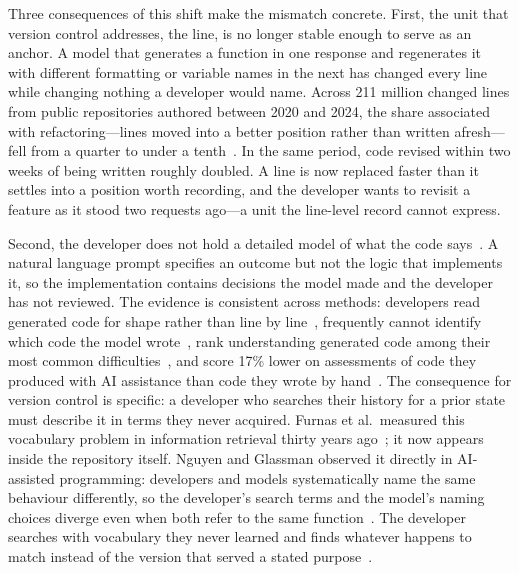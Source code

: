 Three consequences of this shift make the mismatch concrete. First, the unit
that version control addresses, the line, is no longer stable enough to serve as
an anchor. A model that generates a function in one response and regenerates it
with different formatting or variable names in the next has changed every line
while changing nothing a developer would name. Across 211 million changed lines
from public repositories authored between 2020 and 2024, the share associated
with refactoring---lines moved into a better position rather than written
afresh---fell from a quarter to under a tenth~\cite{gitclear2025}. In the same
period, code revised within two weeks of being written roughly doubled. A line is now
replaced faster than it settles into a position worth recording, and the
developer wants to revisit a feature as it stood two requests ago---a unit
the line-level record cannot express.

Second, the developer does not hold a detailed model of what the code
says~\cite{sarkar2022}. A natural language prompt specifies an outcome
but not the logic that implements it, so the implementation contains decisions
the model made and the developer has not reviewed. The evidence is consistent
across methods: developers read generated code for shape rather than line by
line~\cite{barke2023}, frequently cannot identify which code the model
wrote~\cite{tang2024}, rank understanding generated code among their most
common difficulties~\cite{liang2024}, and score 17\% lower on assessments
of code they produced with AI assistance than code they wrote by
hand~\cite{shen2026skills}. The consequence for version control is
specific: a developer who searches their history for a prior state must describe
it in terms they never acquired. Furnas et al.\ measured this vocabulary problem
in information retrieval thirty years ago~\cite{furnas1987}; it now appears
inside the repository itself. Nguyen and Glassman observed it directly in
AI-assisted programming: developers and models systematically name the same
behaviour differently, so the developer's search terms and the model's naming
choices diverge even when both refer to the same
function~\cite{nguyen2024}. The developer searches with vocabulary they
never learned and finds whatever happens to match instead of the version that
served a stated purpose~\cite{codoban2015}.


